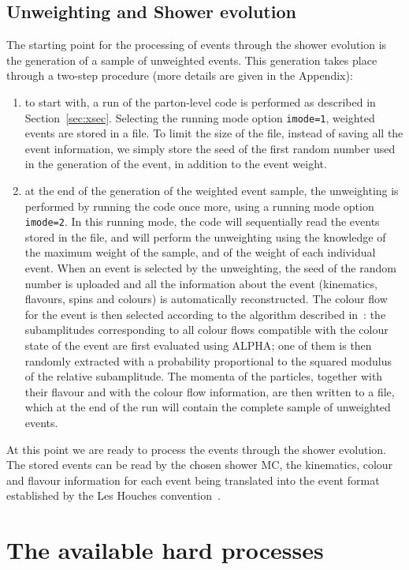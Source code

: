 \documentclass[paper]{JHEP3}
\def\ALPHA{{\small ALPHA}}
\begin{document}
\subsection{Unweighting and Shower evolution}
\label{sec:shower}
The starting point for the processing of events through the shower
evolution is the generation of a sample of unweighted events.
This generation takes place through a two-step procedure (more details
are given in the Appendix):
\begin{enumerate}
\item to start with, a run of the parton-level code is performed as
  described in Section~\ref{sec:xsec}. Selecting the running mode option
  {\tt imode=1}, weighted events are stored in a file. To limit the
  size of the file, instead of saving all the event information, we
  simply store the seed of the first random number used in the
  generation of the event, in addition to the event weight.
\item at the end of the generation of the weighted event sample, the
  unweighting is performed by running the code once more, using a
  running mode option {\tt imode=2}. In this running mode, the code
  will sequentially read the events stored in the file, and will
  perform the unweighting using the knowledge of the maximum weight of
  the sample, and of the weight of each individual event. When an
  event is selected by the unweighting, the seed of the random number
  is uploaded and all the information about the event (kinematics,
  flavours, spins and colours) is automatically reconstructed. The
  colour flow for the event is then selected according to the
  algorithm described in~\cite{Mangano:2001xp}: the subamplitudes
  corresponding to all colour flows compatible with the colour state
  of the event are first evaluated using \ALPHA; one of them
  is then randomly extracted with a probability proportional to the
  squared modulus of the relative subamplitude. The momenta of the
  particles, together with their flavour and with the colour flow
  information, are then written to a file, which at the end of the run
  will contain the complete sample of unweighted events.
\end{enumerate}
At this point we are ready to process the events through the shower
evolution. The stored events can be read by the chosen shower MC, the
kinematics, colour and flavour information for each event being
translated into the event format established by the Les Houches
convention~\cite{Boos:2001cv}.

\section{The available hard processes}
\label{sec:hard}
\end{document}
